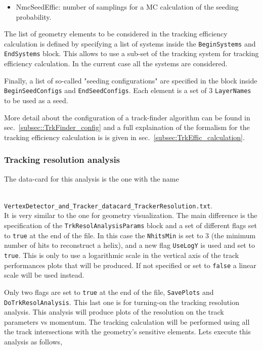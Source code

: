 \begin{itemize}
\begin{itemize}
    \item  {NmcSeedEffic}: number of samplings for a MC calculation of the seeding probability.
  \end{itemize}
  
  The list of geometry elements to be considered in the tracking efficiency calculation is defined by specifying a list of systems inside the {\tt BeginSystems} and {\tt EndSystems} block.
  This allows to use a sub-set of the tracking system for tracking efficiency calculation. In the current case all the systems are considered.
  
  Finally, a list of so-called "seeding configurations" are specified in the block inside {\tt BeginSeedConfigs} and {\tt EndSeedConfigs}. Each element is a set of 3 {\tt LayerNames} to be 
  used as a seed.
  
  More detail about the configuration of a track-finder algorithm can be found in sec.~\ref{subsec::TrkFinder_config} and a full explaination of the formalism for the tracking efficiency calculation 
  is is given in sec.~\ref{subsec:TrkEffic_calculation}.
  
\end{itemize}

\subsubsection*{Tracking resolution analysis}

The data-card for this analysis is the one with the name

~\\
{\small {\tt VertexDetector\_and\_Tracker\_datacard\_TrackerResolution.txt}}.
~\\

\noindent
It is very similar to the one for geometry visualization. The main difference is the specification of the {\tt TrkResolAnalysisParams} block and a set of different flags set to {\tt true}
at the end of the file. In this case the {\tt NhitsMin} is set to 3 (the minimum number of hits to reconstruct a helix), and a new flag {\tt UseLogY} is used and set to {\tt true}. 
This is only to use a logarithmic scale in the vertical axis of the track performances plots that will be produced. If not specified or set to {\tt false} a linear scale will be used instead.

Only two flags are set to {\tt true} at the end of the file, {\tt SavePlots} and {\tt DoTrkResolAnalysis}. This last one is for turning-on the tracking resolution analysis. This 
analysis will produce plots of the resolution on the track parameters vs momentum. The tracking calculation will be performed using all the track intersections with the geometry's 
sensitive elements. Lets execute this analysis as follows,


